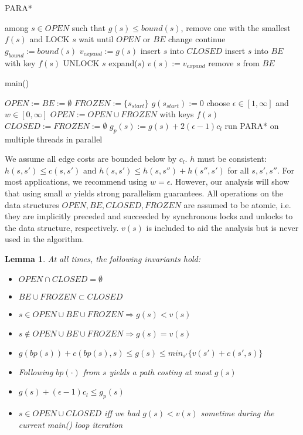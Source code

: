\documentclass[letterpaper]{article}
\newtheorem{lemma}{Lemma}
\begin{document}
\begin{algorithm}
\caption{PARA*}
\label{alg:PARA*}
\begin{algorithmic}
\STATE among $s\in OPEN$ such that $g(s) \le bound(s)$, remove one with the smallest $f(s)$ and LOCK $s$
\STATE wait until $OPEN$ or $BE$ change
\STATE continue
\ENDIF
\STATE $g_{bound} := bound(s)$
\STATE $v_{expand} := g(s)$
\STATE insert $s$ into $CLOSED$
\STATE insert $s$ into $BE$ with key $f(s)$
\STATE UNLOCK $s$
\STATE expand($s$)
\STATE $v(s) := v_{expand}$
\STATE remove $s$ from $BE$
\ENDWHILE
\end{algorithmic}
\end{algorithm}

\begin{algorithm}
\caption{main()}
\label{alg:main}
\begin{algorithmic}
\STATE $OPEN := BE := \emptyset$
\STATE $FROZEN := \{s_{start}\}$
\STATE $g(s_{start}) := 0$
\REPEAT
\STATE choose $\epsilon \in [1,\infty]$ and $w \in [0,\infty]$
\STATE $OPEN := OPEN \cup FROZEN$ with keys $f(s)$
\STATE $CLOSED := FROZEN := \emptyset$
\STATE $g_p(s) := g(s) + 2(\epsilon-1)c_l$
\ENDFOR
\STATE run PARA* on multiple threads in parallel
\end{algorithmic}
\end{algorithm}

We assume all edge costs are bounded below by $c_l$. $h$ must be consistent: $h(s,s') \le c(s,s')$ and $h(s,s') \le h(s,s'')+h(s'',s')$ for all $s,s',s''$. For most applications, we recommend using $w = \epsilon$. However, our analysis will show that using small $w$ yields strong parallelism guarantees. All operations on the data structures $OPEN,BE,CLOSED,FROZEN$ are assumed to be atomic, i.e. they are implicitly preceded and succeeded by synchronous locks and unlocks to the data structure, respectively. $v(s)$ is included to aid the analysis but is never used in the algorithm.

\begin{lemma}
\label{lem:prop}
At all times, the following invariants hold:
\begin{itemize}
\item $OPEN\cap CLOSED = \emptyset$
\item $BE\cup FROZEN \subset CLOSED$
\item $s\in OPEN\cup BE\cup FROZEN \Rightarrow g(s) < v(s)$
\item $s\notin OPEN\cup BE\cup FROZEN \Rightarrow g(s) = v(s)$
\item $g(bp(s)) + c(bp(s),s) \le g(s) \le min_{s'}\{v(s') + c(s',s)\}$
\item Following $bp(\cdot)$ from $s$ yields a path costing at most $g(s)$
\item $g(s) + (\epsilon-1)c_l \le g_p(s)$
\item $s\in OPEN\cup CLOSED$ iff we had $g(s)<v(s)$ sometime during the current main() loop iteration
\end{itemize}
\end{lemma}
\end{document}
